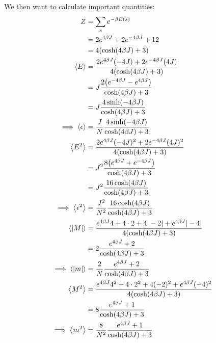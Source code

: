 \documentclass[english,notitlepage,reprint,nofootinbib]{revtex4-2}
\begin{document}
We then want to calculate important quantities:
\begin{align*}
    Z &= \sum_s e^{-\beta E(s)}  \\
    &= 2e^{4\beta J} + 2e^{-4\beta J} + 12 \\
    &= 4(\cosh(4\beta J) + 3) \\
    \avg{E} &= \frac{2e^{4\beta J}(-4J) + 2e^{-4\beta J}(4J)}{4(\cosh(4\beta J) + 3)} \\
    &= J\frac{2\qty(e^{-4\beta J} - e^{4\beta J})}{\cosh(4\beta J) + 3} \\
    &= J\frac{4\sinh(-4\beta J)}{\cosh(4\beta J) + 3} \\
    \implies \avg{\epsilon} &= \frac{J}{N}\frac{4\sinh(-4\beta J)}{\cosh(4\beta J) + 3} \\
    \avg{E^2} &= \frac{2e^{4\beta J}(-4J)^2 + 2e^{-4\beta J}(4J)^2}{4(\cosh(4\beta J) + 3)} \\
    &= J^2\frac{8\qty(e^{4\beta J} + e^{-4\beta J})}{\cosh(4\beta J) + 3} \\
    &= J^2\frac{16\cosh(4\beta J)}{\cosh(4\beta J) + 3} \\
    \implies \avg{\epsilon^2} &= \frac{J^2}{N^2}\frac{16\cosh(4\beta J)}{\cosh(4\beta J) + 3} \\
    \avg{|M|} &= \frac{e^{4\beta J}4 + 4\cdot 2 + 4 |-2| + e^{4\beta J}|-4|}{4(\cosh(4\beta J) + 3)} \\
    &= 2\frac{e^{4\beta J} + 2}{\cosh(4\beta J) + 3} \\
    \implies \avg{|m|} &= \frac{2}{N}\frac{e^{4\beta J} + 2}{\cosh(4\beta J) + 3} \\
    \avg{M^2} &= \frac{e^{4\beta J}4^2 + 4\cdot 2^2 + 4 (-2)^2 + e^{4\beta J}(-4)^2}{4(\cosh(4\beta J) + 3)} \\
    &= 8\frac{e^{4\beta J} + 1}{\cosh(4\beta J) + 3} \\
    \implies \avg{m^2} &= \frac{8}{N^2}\frac{e^{4\beta J} + 1}{\cosh(4\beta J) + 3} \\
\end{align*}
\end{document}
